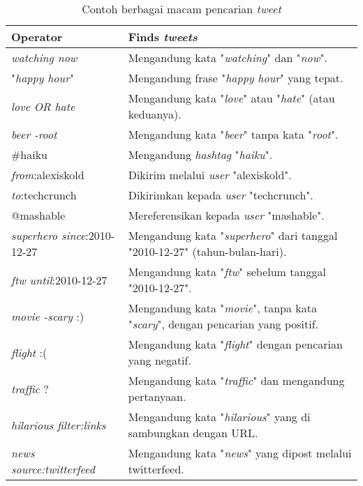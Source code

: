 \begin{table}[h]
\caption{Contoh berbagai macam pencarian \textit{tweet}}
\begin{tabular}{|l|l|}
\hline
\textbf{Operator}          					& \textbf{Finds \textit{tweets}}                                            \\ \hline
\textit{watching now}               & Mengandung kata "\textit{watching}" dan "\textit{now}". 						       \\
"\textit{happy hour}"               & Mengandung frase "\textit{happy hour}" yang tepat.                                 \\
\textit{love OR hate}               & Mengandung kata "\textit{love}" atau "\textit{hate}" (atau keduanya).                             \\
\textit{beer -root}                 & Mengandung kata "\textit{beer}" tanpa kata "\textit{root}".                                         \\
\#haiku                    					& Mengandung \textit{hashtag} "\textit{haiku}".                                            \\
\textit{from}:alexiskold            & Dikirim melalui \textit{user} "alexiskold".                                            \\
\textit{to}:techcrunch              & Dikirimkan kepada \textit{user} "techcrunch".                                              \\
@mashable                  					& Mereferensikan kepada \textit{user} "mashable".                                            \\
\textit{superhero since}:2010-12-27 & Mengandung kata "\textit{superhero}" dari tanggal "2010-12-27" (tahun-bulan-hari). \\
\textit{ftw until}:2010-12-27       & Mengandung kata "\textit{ftw}" sebelum tanggal "2010-12-27".                   \\
\textit{movie -scary} :)            & Mengandung kata "\textit{movie}", tanpa kata "\textit{scary}", dengan pencarian yang positif.        \\
\textit{flight} :(                  & Mengandung kata "\textit{flight}" dengan pencarian yang negatif.                         \\
\textit{traffic} ?                  & Mengandung kata "\textit{traffic}" dan mengandung pertanyaan.                               \\
\textit{hilarious filter:links}     & Mengandung kata "\textit{hilarious}" yang di sambungkan dengan URL.                                \\
\textit{news source:twitterfeed}    & Mengandung kata "\textit{news}" yang dipost melalui twitterfeed.						\\        \hline                     
\end{tabular}
\end{table}

